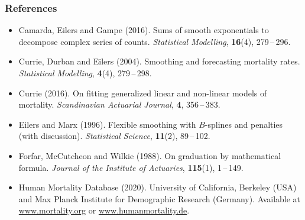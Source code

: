 \documentclass[12pt, xcolor=table]{beamer}  %
\begin{document}
\begin{frame}[noframenumbering]\frametitle{References}
	\scriptsize

\begin{itemize}
\setlength\itemsep{1.2em}	
%	
%	
	
	\item[] Camarda, Eilers and Gampe (2016). Sums of smooth exponentials to decompose complex series of counts. {\it Statistical Modelling}, {\bf 16}(4), 279\,--\,296.
	
	\item[] Currie, Durban and Eilers (2004). Smoothing and forecasting mortality rates. {\it Statistical Modelling}, {\bf 4}(4), 279\,--\,298.
	
	\item[] Currie (2016). On fitting generalized linear and non-linear models of mortality. {\it Scandinavian Actuarial Journal}, {\bf 4}, 356\,--\,383.
	
	\item[] Eilers and Marx (1996). Flexible smoothing with $B$-splines and penalties (with discussion). {\it Statistical Science}, {\bf 11}(2), 89\,--\,102.
	
	\item[] Forfar, McCutcheon and Wilkie (1988). On graduation by mathematical formula. {\it Journal of the Institute of Actuaries}, {\bf 115}(1), 1\,--\,149.
	
	\item[] Human Mortality Database (2020). University of California, Berkeley (USA) and Max Planck Institute for Demographic Research (Germany). Available at \url{www.mortality.org} or \url{www.humanmortality.de}.

\end{itemize}

\end{frame}
\end{document}

